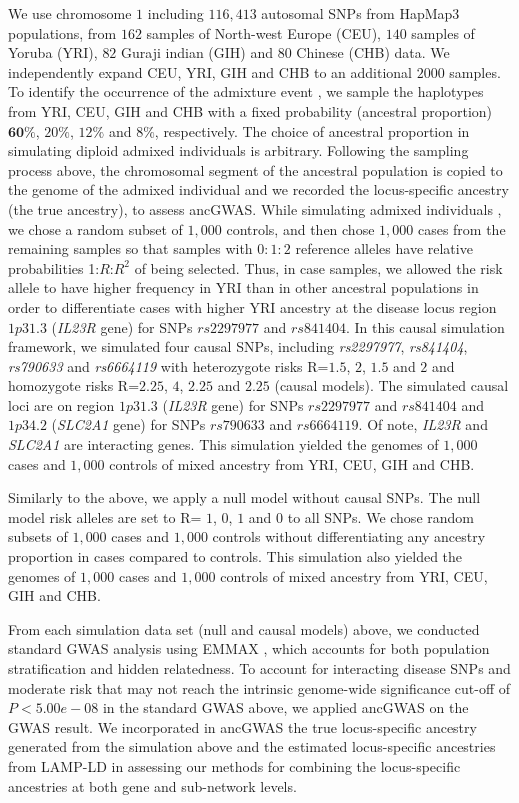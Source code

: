 \documentclass[10pt]{article}
\begin{document}
We use chromosome $1$ including $116,413$ autosomal SNPs from HapMap3 populations, from $162$ samples of North-west Europe (CEU), $140$ samples of Yoruba (YRI), $82$ Guraji indian (GIH) and $80$ Chinese (CHB) data. We independently expand CEU, YRI, GIH and CHB to an additional $2000$ samples. To identify the occurrence of the admixture event \cite{chims}, we sample the haplotypes from YRI, CEU, GIH and CHB with a fixed probability (ancestral proportion) $\textbf{60}\%$, $20\%$, $12\%$ and $8\%$, respectively. The choice of ancestral proportion in simulating diploid admixed individuals is arbitrary. Following the sampling process above, the chromosomal segment of the ancestral population is copied to the genome of the admixed individual and we recorded the locus-specific ancestry (the true ancestry), to assess ancGWAS. While simulating admixed individuals \cite{chims}, we chose a random subset of $1,000$ controls, and then chose $1,000$ cases from the remaining samples so that samples with $0:1:2$ reference alleles have relative probabilities 1:$R$:$R^{2}$ of being selected. Thus, in case samples, we allowed the risk allele to have higher frequency in YRI than in other ancestral populations in order to differentiate cases with higher YRI ancestry at the disease locus region $1p31.3$ (\textit{IL23R} gene) for SNPs $rs2297977$ and $rs841404$. In this causal simulation framework, we simulated four causal SNPs, including \textit{rs2297977}, \textit{rs841404}, \textit{rs790633} and \textit{rs6664119} with heterozygote risks R=$1.5$, $2$, $1.5$ and $2$ and homozygote risks R=$2.25$, $4$, $2.25$ and $2.25$ (causal models). The simulated causal loci are on region $1p31.3$ (\textit{IL23R} gene) for SNPs $rs2297977$ and $rs841404$ and $1p34.2$ (\textit{SLC2A1} gene) for SNPs $rs790633$ and $rs6664119$. Of note, \textit{IL23R} and \textit{SLC2A1} are interacting genes. This simulation yielded the genomes of $1,000$ cases and $1,000$ controls of mixed ancestry from  YRI, CEU, GIH and CHB.

Similarly to the above, we apply a null model without causal SNPs. The null model risk alleles are set to R= $1$, $0$, $1$ and $0$ to all SNPs. We chose random subsets of $1,000$ cases and $1,000$ controls without differentiating any ancestry proportion in cases compared to controls. This simulation also yielded the genomes of $1,000$ cases and $1,000$ controls of mixed ancestry from  YRI, CEU, GIH and CHB. 

From each simulation data set (null and causal models) above, we conducted standard GWAS analysis using EMMAX \cite{emax1}, which accounts for both population stratification and hidden relatedness. To account for interacting disease SNPs and moderate risk that may not reach the intrinsic genome-wide significance cut-off of $P < 5.00e-08$ in the standard GWAS above, we applied ancGWAS on the GWAS result. We incorporated in ancGWAS the true locus-specific ancestry generated from the simulation above and the estimated locus-specific ancestries from LAMP-LD \cite{yael} in assessing our methods for combining the locus-specific ancestries at both gene and sub-network levels.
\end{document}
